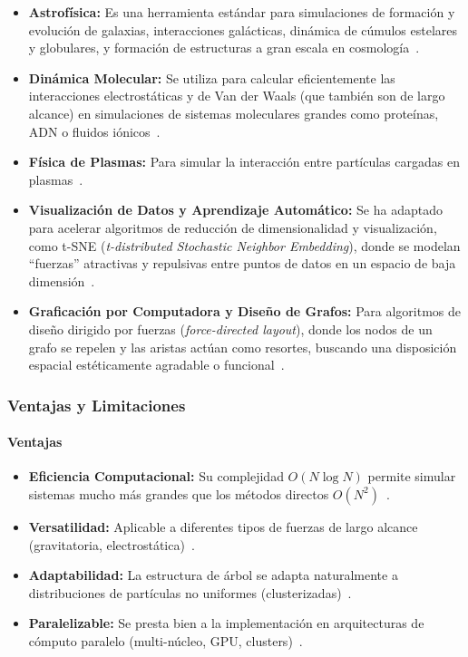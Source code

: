 \begin{itemize}
    \item \textbf{Astrofísica:} Es una herramienta estándar para simulaciones de formación y evolución de galaxias, interacciones galácticas, dinámica de cúmulos estelares y globulares, y formación de estructuras a gran escala en cosmología~\cite{dubinski1996, salmon1991, bagla2004}.
    \item \textbf{Dinámica Molecular:} Se utiliza para calcular eficientemente las interacciones electrostáticas y de Van der Waals (que también son de largo alcance) en simulaciones de sistemas moleculares grandes como proteínas, ADN o fluidos iónicos~\cite{pfalzner1996, Gan2014}.
    \item \textbf{Física de Plasmas:} Para simular la interacción entre partículas cargadas en plasmas~\cite{winkel2012}.
    \item \textbf{Visualización de Datos y Aprendizaje Automático:} Se ha adaptado para acelerar algoritmos de reducción de dimensionalidad y visualización, como t-SNE (\textit{t-distributed Stochastic Neighbor Embedding}), donde se modelan ``fuerzas'' atractivas y repulsivas entre puntos de datos en un espacio de baja dimensión~\cite{vandemaaten2008, vandermaaten2013}.
    \item \textbf{Graficación por Computadora y Diseño de Grafos:} Para algoritmos de diseño dirigido por fuerzas (\textit{force-directed layout}), donde los nodos de un grafo se repelen y las aristas actúan como resortes, buscando una disposición espacial estéticamente agradable o funcional~\cite{Nguyen2007}.
\end{itemize}

\subsubsection{Ventajas y Limitaciones}

\paragraph{Ventajas}
\begin{itemize}
    \item \textbf{Eficiencia Computacional:} Su complejidad $O(N \log N)$ permite simular sistemas mucho más grandes que los métodos directos $O(N^2)$~\cite{Barnes1986}.
    \item \textbf{Versatilidad:} Aplicable a diferentes tipos de fuerzas de largo alcance (gravitatoria, electrostática)~\cite{pfalzner1996, Gan2014}.
    \item \textbf{Adaptabilidad:} La estructura de árbol se adapta naturalmente a distribuciones de partículas no uniformes (clusterizadas)~\cite{becciani1997, dubinski1996}.
    \item \textbf{Paralelizable:} Se presta bien a la implementación en arquitecturas de cómputo paralelo (multi-núcleo, GPU, clusters)~\cite{dubinski1996, burtscher2011}.
\end{itemize}

